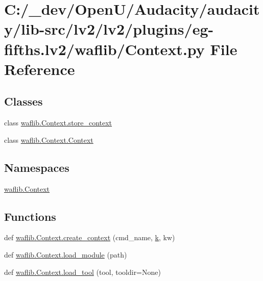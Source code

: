 \hypertarget{lv2_2plugins_2eg-fifths_8lv2_2waflib_2_context_8py}{}\section{C\+:/\+\_\+dev/\+Open\+U/\+Audacity/audacity/lib-\/src/lv2/lv2/plugins/eg-\/fifths.lv2/waflib/\+Context.py File Reference}
\label{lv2_2plugins_2eg-fifths_8lv2_2waflib_2_context_8py}
\subsection*{Classes}
\begin{DoxyCompactItemize}
\item 
class \hyperlink{classwaflib_1_1_context_1_1store__context}{waflib.\+Context.\+store\+\_\+context}
\item 
class \hyperlink{classwaflib_1_1_context_1_1_context}{waflib.\+Context.\+Context}
\end{DoxyCompactItemize}
\subsection*{Namespaces}
\begin{DoxyCompactItemize}
\item 
 \hyperlink{namespacewaflib_1_1_context}{waflib.\+Context}
\end{DoxyCompactItemize}
\subsection*{Functions}
\begin{DoxyCompactItemize}
\item 
def \hyperlink{namespacewaflib_1_1_context_a224d64e5e44f9aae4903dc52235d6470}{waflib.\+Context.\+create\+\_\+context} (cmd\+\_\+name, \hyperlink{rfft2d_test_m_l_8m_adc468c70fb574ebd07287b38d0d0676d}{k}, kw)
\item 
def \hyperlink{namespacewaflib_1_1_context_ae0923656ff2aebede696050061d6d48d}{waflib.\+Context.\+load\+\_\+module} (path)
\item 
def \hyperlink{namespacewaflib_1_1_context_a2f9fe1693a40a8fa972154b9eeec3424}{waflib.\+Context.\+load\+\_\+tool} (tool, tooldir=None)
\end{DoxyCompactItemize}
